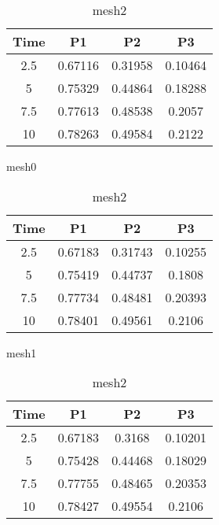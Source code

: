 \begin{table}[htbp]
    \centering
    \begin{subtable}{0.45\linewidth}
        \centering
        \begin{tabular}{cccc}
            \hline
            \textbf{Time} & \textbf{P1} & \textbf{P2} & \textbf{P3} \\
            \hline
            2.5 & 0.67116 & 0.31958 & 0.10464 \\
            5   & 0.75329 & 0.44864 & 0.18288 \\
            7.5 & 0.77613 & 0.48538 & 0.2057  \\
            10  & 0.78263 & 0.49584 & 0.2122  \\
            \hline
        \end{tabular}
        \caption{mesh0}
        \label{subtab:mesh0}
    \end{subtable}
    \hfill
    \begin{subtable}{0.45\linewidth}
        \centering
        \begin{tabular}{cccc}
            \hline
            \textbf{Time} & \textbf{P1} & \textbf{P2} & \textbf{P3} \\
            \hline
            2.5 & 0.67183 & 0.31743 & 0.10255 \\
            5   & 0.75419 & 0.44737 & 0.1808 \\
            7.5 & 0.77734 & 0.48481 & 0.20393 \\
            10  & 0.78401 & 0.49561 & 0.2106 \\
            \hline
        \end{tabular}
        \caption{mesh1}
        \label{subtab:mesh1}
    \end{subtable}
    \hfill
    \begin{subtable}{0.45\linewidth}
        \centering
        \begin{tabular}{cccc}
            \hline
            \textbf{Time} & \textbf{P1} & \textbf{P2} & \textbf{P3} \\
            \hline
            2.5 & 0.67183 & 0.3168 & 0.10201 \\
            5   & 0.75428 & 0.44468 & 0.18029 \\
            7.5 & 0.77755 & 0.48465 & 0.20353 \\
            10  & 0.78427 & 0.49554 & 0.2106 \\
            \hline
        \end{tabular}
        \caption{mesh2}
        \label{subtab:mesh2}

\end{subtable}
\end{table}
